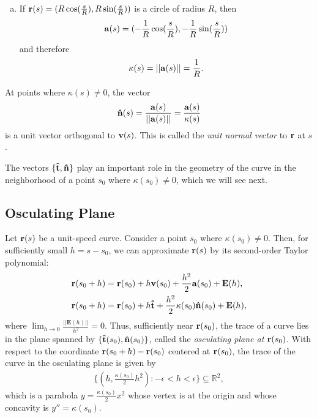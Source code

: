 \documentclass[12pt,letterpaper,reqno]{article}
\numberwithin{equation}{section}
\newcommand{\R}{\ensuremath{\mathbb R}}
\newcommand{\bv}{{\bf v}}
\newcommand{\ba}{{\bf a}}
\newcommand{\bbr}{{\bf r}}
\newcommand{\ut}{{\bf {\hat{t}}}}
\newcommand{\un}{{\bf {\hat{n}}}}
\begin{document}
{\begin{example}
\begin{enumerate}[(a)]
\item If $\bbr(s)=(R\cos(\frac{s}{R}),R\sin(\frac{s}{R}))$ is a circle of radius $R$, then
\begin{align*}
	\ba(s)=(-\frac{1}{R}\cos(\frac{s}{R}),-\frac{1}{R}\sin(\frac{s}{R}))
\end{align*}
and therefore
\begin{align*}
	\kappa(s)=||\ba(s)||=\frac{1}{R}.
\end{align*}
\end{enumerate}	
\end{example}

\begin{defn}
At points where $\kappa(s) \neq 0$, the vector
\begin{align*}
	\mathbf{\hat{n}}(s)=\frac{\ba(s)}{||\ba(s)||}=\frac{\ba(s)}{\kappa(s)}
\end{align*}
is a unit vector orthogonal to $\bv(s)$. This is called the \emph{unit normal vector} to $\bbr$ at $s$.	
\end{defn}
The vectors $\{\ut, \un\}$ play an important role in the geometry of the curve in the neighborhood of a point $s_0$ where $\kappa(s_0)\neq 0$, which we will see next.

\subsection{Osculating Plane}
Let $\bbr(s)$ be a unit-speed curve. Consider a point $s_0$ where $\kappa(s_0) \neq 0$. Then, for sufficiently small $h=s-s_0$, we can approximate $\bbr(s)$ by its second-order Taylor polynomial:
\begin{align*}
	\bbr(s_0+h)&=\bbr(s_0)+h\bv(s_0)+\frac{h^2}{2}\ba(s_0)+\mathbf{E}(h),  \\
	\bbr(s_0+h)&=\bbr(s_0)+h\mathbf{\hat{t}}+\frac{h^2}{2}\kappa(s_0)\un(s_0)+\mathbf{E}(h),  \\
\end{align*}
where $\lim_{h \to 0}\frac{||\mathbf{E}(h)||}{h^2}=0$. Thus, sufficiently near $\bbr(s_0)$, the trace of a curve lies in the plane spanned by $\{\ut(s_0),\un(s_0)\}$, called the \emph{osculating plane at $\bbr(s_0)$}. With respect to the coordinate $\bbr(s_0+h)-\bbr(s_0)$ centered at $\bbr(s_0)$, the trace of the curve in the osculating plane is given by 
\begin{align*}
	\{(h,\frac{\kappa(s_0)}{2}h^2):-\epsilon < h < \epsilon\} \subseteq \R^2,
\end{align*}
which is a parabola $y=\frac{\kappa(s_0)}{2}x^2$ whose vertex is at the origin and whose concavity is $y''=\kappa(s_0)$.

}
\end{document}
